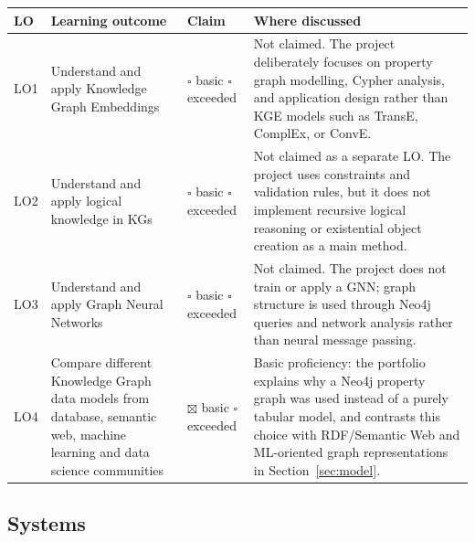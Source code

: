 \documentclass[11pt,a4paper]{article}
\newcommand{\checkedbox}{\(\boxtimes\)}
\newcommand{\emptybox}{\(\square\)}
\begin{document}
\begin{longtable}{p{}p{}p{}p{}}
\toprule
LO & Learning outcome & Claim & Where discussed \\
\midrule
\endhead
LO1 & Understand and apply Knowledge Graph Embeddings &
\emptybox{} basic \quad \emptybox{} exceeded &
Not claimed. The project deliberately focuses on property graph modelling,
Cypher analysis, and application design rather than KGE models such as TransE,
ComplEx, or ConvE. \\
\addlinespace
LO2 & Understand and apply logical knowledge in KGs &
\emptybox{} basic \quad \emptybox{} exceeded &
Not claimed as a separate LO. The project uses constraints and validation
rules, but it does not implement recursive logical reasoning or existential
object creation as a main method. \\
\addlinespace
LO3 & Understand and apply Graph Neural Networks &
\emptybox{} basic \quad \emptybox{} exceeded &
Not claimed. The project does not train or apply a GNN; graph structure is used
through Neo4j queries and network analysis rather than neural message passing. \\
\addlinespace
LO4 & Compare different Knowledge Graph data models from database, semantic web, machine learning and data science communities &
\checkedbox{} basic \quad \emptybox{} exceeded &
Basic proficiency: the portfolio explains why a Neo4j property graph was used
instead of a purely tabular model, and contrasts this choice with RDF/Semantic
Web and ML-oriented graph representations in Section~\ref{sec:model}. \\
\bottomrule
\end{longtable}

\subsection*{Systems}
\end{document}
